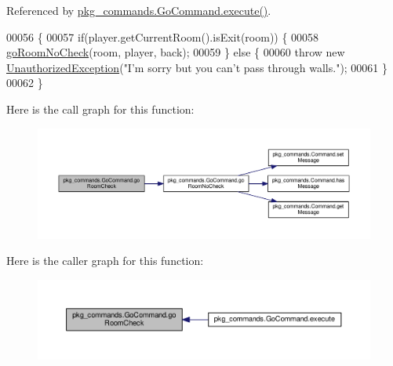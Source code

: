 Referenced by \hyperlink{GoCommand_8java_source_l00032}{pkg\-\_\-commands.\-Go\-Command.\-execute()}.


\begin{DoxyCode}
00056                                                                                                            
                                       \{
00057         \textcolor{keywordflow}{if}(player.getCurrentRoom().isExit(room)) \{
00058             \hyperlink{classpkg__commands_1_1GoCommand_a210afbc5f3ef34d3ad5759d853c8f8c2}{goRoomNoCheck}(room, player, back);
00059         \} \textcolor{keywordflow}{else} \{
00060             \textcolor{keywordflow}{throw} \textcolor{keyword}{new} \hyperlink{classpkg__exceptions_1_1UnauthorizedException}{UnauthorizedException}(\textcolor{stringliteral}{"I'm sorry but you can't pass through
       walls."});
00061         \}
00062     \}
\end{DoxyCode}


Here is the call graph for this function\-:
\nopagebreak
\begin{figure}[H]
\begin{center}
\leavevmode
\includegraphics[width=350pt]{classpkg__commands_1_1GoCommand_acbf1aa81fa5b1aef7cafb8b4e3ace3a9_cgraph}
\end{center}
\end{figure}




Here is the caller graph for this function\-:
\nopagebreak
\begin{figure}[H]
\begin{center}
\leavevmode
\includegraphics[width=350pt]{classpkg__commands_1_1GoCommand_acbf1aa81fa5b1aef7cafb8b4e3ace3a9_icgraph}
\end{center}
\end{figure}


